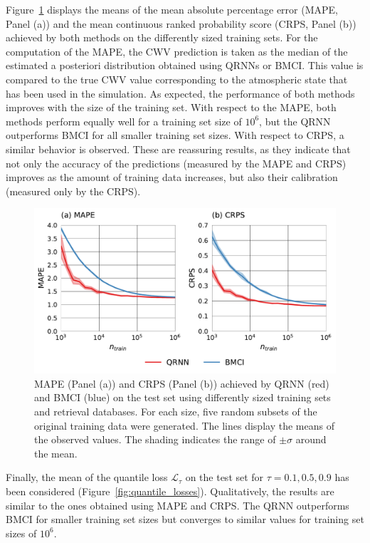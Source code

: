 \documentclass[journal abbreviation, manuscript]{copernicus}
\begin{document}
Figure~\ref{fig:mape_crps} displays the means of the mean absolute percentage
error (MAPE, Panel (a)) and the mean continuous ranked probability score (CRPS,
Panel (b)) achieved by both methods on the differently sized training sets.
For the computation of the MAPE, the CWV prediction is taken as the median of
the estimated a posteriori distribution obtained using QRNNs or BMCI. This value
is compared to the true CWV value corresponding to the atmospheric state that
has been used in the simulation. As expected, the performance of both methods
improves with the size of the training set. With respect to the MAPE, both
methods perform equally well for a training set size of $10^6$, but the QRNN
outperforms BMCI for all smaller training set sizes. With respect to CRPS, a
similar behavior is observed. These are reassuring results, as they indicate
that not only the accuracy of the predictions (measured by the MAPE and CRPS) improves
as the amount of training data increases, but also their calibration (measured
 only by the CRPS).

  \begin{figure}[hbpt!]
    \includegraphics[width = 0.8\linewidth]{../plots/fig05}
    \caption{MAPE (Panel (a)) and CRPS (Panel (b)) achieved by QRNN (red) and BMCI (blue)
      on the test set using differently sized training sets and retrieval
    databases. For each size, five random subsets of the original training data were
    generated. The lines display the means of the observed values. The shading
    indicates the range of $\pm \sigma$ around the mean.}
    \label{fig:mape_crps}
  \end{figure}

Finally, the mean of the quantile loss $\mathcal{L}_\tau$ on the test set for
$\tau = 0.1, 0.5, 0.9$ has been considered (Figure~\ref{fig:quantile_losses}).
Qualitatively, the results are similar to the ones obtained using MAPE and CRPS.
The QRNN outperforms BMCI for smaller training set sizes but converges to similar
 values for training set sizes of $10^6$.
\end{document}
